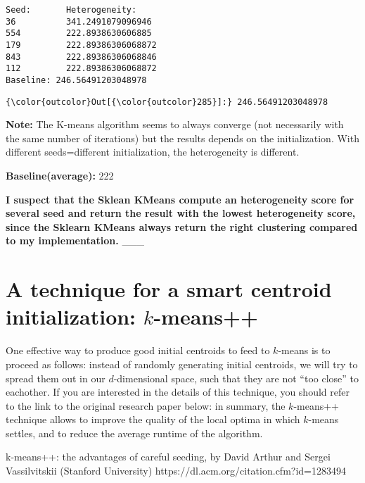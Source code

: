 \documentclass[11pt]{article}
\begin{document}
    \begin{Verbatim}[commandchars=\\\{\}]
Seed:       Heterogeneity:
36          341.2491079096946
554         222.8938630606885
179         222.89386306068872
843         222.89386306068846
112         222.89386306068872
Baseline: 246.56491203048978

    \end{Verbatim}

\begin{Verbatim}[commandchars=\\\{\}]
{\color{outcolor}Out[{\color{outcolor}285}]:} 246.56491203048978
\end{Verbatim}
            
    \textbf{Note:} The K-means algorithm seems to always converge (not
necessarily with the same number of iterations) but the results depends
on the initialization. With different seeds=different initialization,
the heterogeneity is different.

\textbf{Baseline(average):} 222

\textbf{I suspect that the Sklean KMeans compute an heterogeneity score
for several seed and return the result with the lowest heterogeneity
score, since the Sklearn KMeans always return the right clustering
compared to my implementation.} \_\_\_

    \hypertarget{a-technique-for-a-smart-centroid-initialization-k-means}{%
\section{\texorpdfstring{A technique for a smart centroid
initialization:
\(k\)-means++}{A technique for a smart centroid initialization: k-means++}}\label{a-technique-for-a-smart-centroid-initialization-k-means}}

One effective way to produce good initial centroids to feed to
\(k\)-means is to proceed as follows: instead of randomly generating
initial centroids, we will try to spread them out in our
\(d\)-dimensional space, such that they are not ``too close'' to
eachother. If you are interested in the details of this technique, you
should refer to the link to the original research paper below: in
summary, the \(k\)-means++ technique allows to improve the quality of
the local optima in which \(k\)-means settles, and to reduce the average
runtime of the algorithm.

k-means++: the advantages of careful seeding, by David Arthur and Sergei
Vassilvitskii (Stanford University)
https://dl.acm.org/citation.cfm?id=1283494
\end{document}
